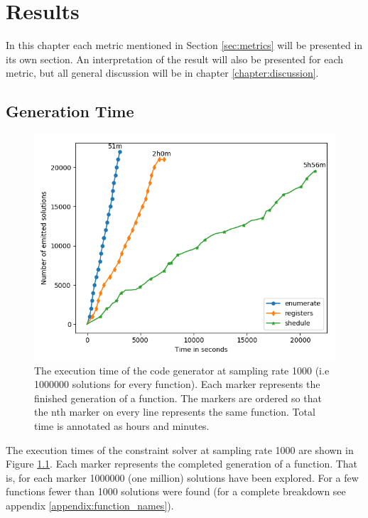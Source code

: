 \chapter{Results}

In this chapter each metric mentioned in Section \ref{sec:metrics} will be presented in
its own section. An interpretation of the result will also be presented for each
metric, but all general discussion will be in chapter \ref{chapter:discussion}.

\section{Generation Time}

\begin{figure}[h]
	\centering
	\includegraphics[width=\textwidth,height=0.5\textheight]{results/figures/generator_time}
	\caption{The execution time of the code generator at sampling rate 1000 (i.e 1000000 solutions for every function). Each marker represents the finished generation of a function. The markers are ordered so that the nth marker on every line represents the same function. Total time is annotated as hours and minutes.}
	\label{fig:time}
\end{figure}

The execution times of the constraint solver at sampling rate 1000 are shown in Figure
\ref{fig:time}. Each marker represents the completed generation of a function. That is,
for each marker 1000000 (one million) solutions have been explored. For a few functions
fewer than 1000 solutions were found (for a complete breakdown see appendix
\ref{appendix:function_names}).

